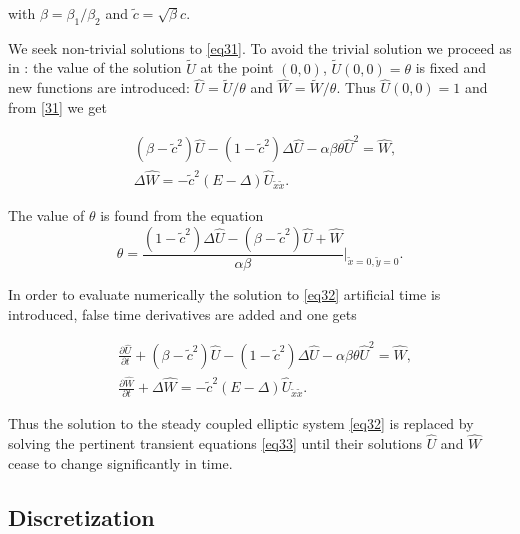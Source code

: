 \documentclass[12pt]{article}
\theoremstyle{theorem}
\theoremstyle{defi}
\begin{document}
with $\beta = \beta_1 / \beta_2$ and $ \tilde c = \sqrt {\beta} c$.

We seek  non-trivial solutions to \eqref{eq31}. To avoid the trivial solution we proceed as in \cite{ref6}: the value of the solution $\tilde U$ at the point $(0,0)$,  $\tilde U(0,0)=\theta $ is fixed and new  functions are introduced: $\widehat{U}=\tilde U /{\theta} $ and $\widehat{W}=\tilde W /{\theta} $. Thus  
$ \widehat{U}(0,0)=1$ and from \eqref{31} we get

\begin{equation}\label{eq32}
\begin{split}
& (\beta-\tilde c^2) \widehat{U}  -(1-\tilde c^2) \Delta \widehat{U} - \alpha \beta \theta \widehat{U}^2 = \widehat{W}, \\
&\Delta \widehat{W} = - \tilde c^2 (E- \Delta) \widehat{U}_{\tilde x \tilde x}.
\end{split}
\end{equation}

The value of $\theta $ is found from the  equation 
\begin{equation}\label{eqtheta}
\theta = \frac{ (1-\tilde c^2 )\Delta \widehat{U} - (\beta-\tilde c^2) \widehat{U} +\widehat{W}}{\alpha \beta} |_{\tilde x=0,\tilde y=0} .
\end{equation}

In order to evaluate numerically the solution to \eqref{eq32} artificial time is introduced, false time derivatives are added and one gets

\begin{equation}\label{eq33}
\begin{split}
&\frac {\partial \widehat{U}}{\partial t} + (\beta-\tilde c^2) \widehat{U} - (1-\tilde c^2 ) \Delta \widehat{U} - \alpha \beta \theta \widehat{U}^2 = \widehat{W}, \\
&\frac {\partial \widehat{W}}{\partial t} + \Delta \widehat{W} = - \tilde c^2 (E- \Delta) \widehat{U}_{\tilde x \tilde x}. 
\end{split}
\end{equation}

Thus the solution to the steady coupled elliptic system \eqref{eq32} is replaced by solving the pertinent transient equations \eqref{eq33} until their solutions $\widehat{U}$ and $\widehat{W}$ cease to change significantly in time. 

\subsection{Discretization}
\end{document}
